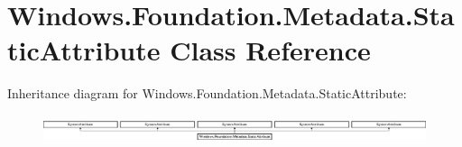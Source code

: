 \hypertarget{class_windows_1_1_foundation_1_1_metadata_1_1_static_attribute}{}\section{Windows.\+Foundation.\+Metadata.\+Static\+Attribute Class Reference}
\label{class_windows_1_1_foundation_1_1_metadata_1_1_static_attribute}
Inheritance diagram for Windows.\+Foundation.\+Metadata.\+Static\+Attribute\+:\begin{figure}[H]
\begin{center}
\leavevmode
\includegraphics[height=0.814545cm]{class_windows_1_1_foundation_1_1_metadata_1_1_static_attribute}
\end{center}
\end{figure}
